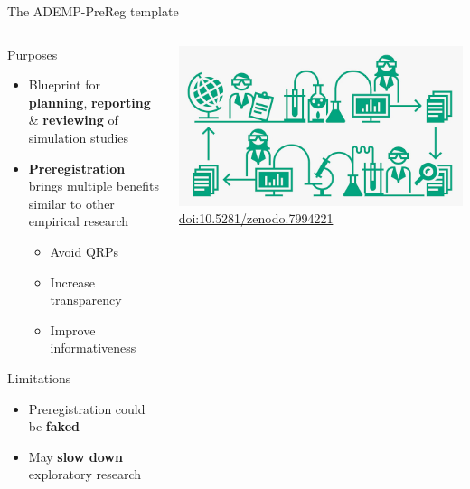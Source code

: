 \documentclass[english, 12pt, aspectratio=169]{beamer}
\begin{document}
\begin{frame}{The ADEMP-PreReg template}
  \begin{columns}
    \begin{column}{0.6\textwidth}

  \begin{block}{Purposes}
    \begin{itemize}
      \pause
      \item Blueprint for \alert{\textbf{planning}}, \alert{\textbf{reporting}} \& \alert{\textbf{reviewing}}  of simulation studies
      \pause
      \item \alert{\textbf{Preregistration}} brings multiple benefits similar to other empirical research
      \begin{itemize}
      \item Avoid QRPs
      \item Increase transparency
      \item Improve informativeness
      \end{itemize}
    \end{itemize}
  \end{block}

  \begin{block}{Limitations}
    \begin{itemize}
    \pause
      \item Preregistration could be \alert{\textbf{faked}}
    \pause
      \item May \alert{\textbf{slow down}} exploratory research
    \end{itemize}

  \end{block}
  \end{column}
  \begin{column}{0.4\textwidth}
\centering
    \includegraphics[width=\textwidth]{pics/CRScycle.JPG} \\
    {\tiny \color{gray} \href{https://zenodo.org/doi/10.5281/zenodo.7994221}{doi:10.5281/zenodo.7994221}}


  \end{column}
\end{columns}
\end{frame}
\end{document}
